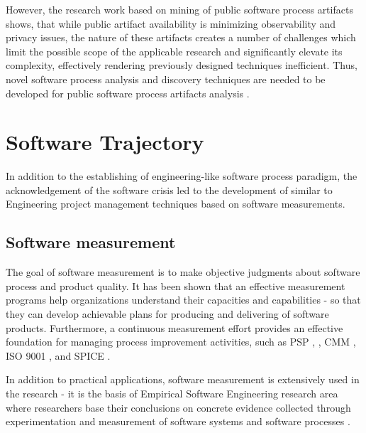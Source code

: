 However, the research work based on mining of public software process artifacts shows, that while public 
artifact availability is minimizing observability and privacy issues, the nature of these artifacts creates a number of 
challenges which limit the possible scope of the applicable research and significantly elevate its complexity, 
effectively rendering previously designed techniques inefficient.
Thus, novel software process analysis and discovery techniques are needed to be developed for public software 
process artifacts analysis \cite{citeulike:7853299}.

%
%
\section{Software Trajectory}\label{sec_software_trajectory}
In addition to the establishing of engineering-like software process paradigm, the acknowledgement of 
the software crisis led to the development of similar to Engineering project management techniques based on 
software measurements.

\subsection{Software measurement}\label{sec_software_metrics}
The goal of software measurement is to make objective judgments about software process and product quality. 
It has been shown that an effective measurement programs help organizations understand their capacities and 
capabilities - so that they can develop achievable plans for producing and delivering of software products. 
Furthermore, a continuous measurement effort provides an effective foundation for managing process 
improvement activities, such as PSP \cite{citeulike:8347315}, \cite{citeulike:5090131} 
\cite{citeulike:12929216}, CMM \cite{citeulike:9962021}, ISO 9001 \cite{iso-standard}, 
and SPICE \cite{spice-standard}.

In addition to practical applications, software measurement is extensively used in the research - it is the basis of 
Empirical Software Engineering research area where researchers base their conclusions on concrete evidence collected 
through experimentation and measurement of software systems and software processes \cite{citeulike:766768}.


